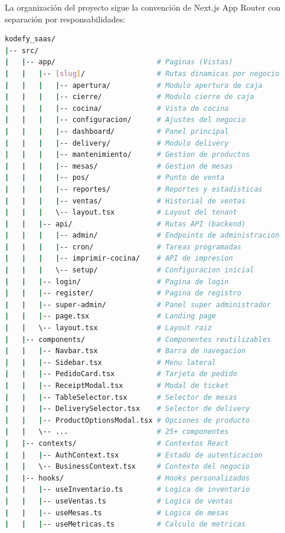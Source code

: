 \documentclass[12pt, a4paper]{article}
\begin{document}
La organización del proyecto sigue la convención de Next.js App Router con separación por responsabilidades:

\begin{lstlisting}[language=bash, caption={Árbol de directorios del proyecto}]
kodefy_saas/
|-- src/
|   |-- app/                        # Paginas (Vistas)
|   |   |-- [slug]/                 # Rutas dinamicas por negocio
|   |   |   |-- apertura/           # Modulo apertura de caja
|   |   |   |-- cierre/             # Modulo cierre de caja
|   |   |   |-- cocina/             # Vista de cocina
|   |   |   |-- configuracion/      # Ajustes del negocio
|   |   |   |-- dashboard/          # Panel principal
|   |   |   |-- delivery/           # Modulo delivery
|   |   |   |-- mantenimiento/      # Gestion de productos
|   |   |   |-- mesas/              # Gestion de mesas
|   |   |   |-- pos/                # Punto de venta
|   |   |   |-- reportes/           # Reportes y estadisticas
|   |   |   |-- ventas/             # Historial de ventas
|   |   |   \-- layout.tsx          # Layout del tenant
|   |   |-- api/                    # Rutas API (backend)
|   |   |   |-- admin/              # Endpoints de administracion
|   |   |   |-- cron/               # Tareas programadas
|   |   |   |-- imprimir-cocina/    # API de impresion
|   |   |   \-- setup/              # Configuracion inicial
|   |   |-- login/                  # Pagina de login
|   |   |-- register/               # Pagina de registro
|   |   |-- super-admin/            # Panel super administrador
|   |   |-- page.tsx                # Landing page
|   |   \-- layout.tsx              # Layout raiz
|   |-- components/                 # Componentes reutilizables
|   |   |-- Navbar.tsx              # Barra de navegacion
|   |   |-- Sidebar.tsx             # Menu lateral
|   |   |-- PedidoCard.tsx          # Tarjeta de pedido
|   |   |-- ReceiptModal.tsx        # Modal de ticket
|   |   |-- TableSelector.tsx       # Selector de mesas
|   |   |-- DeliverySelector.tsx    # Selector de delivery
|   |   |-- ProductOptionsModal.tsx # Opciones de producto
|   |   \-- ...                     # 25+ componentes
|   |-- contexts/                   # Contextos React
|   |   |-- AuthContext.tsx         # Estado de autenticacion
|   |   \-- BusinessContext.tsx     # Contexto del negocio
|   |-- hooks/                      # Hooks personalizados
|   |   |-- useInventario.ts        # Logica de inventario
|   |   |-- useVentas.ts            # Logica de ventas
|   |   |-- useMesas.ts             # Logica de mesas
|   |   |-- useMetricas.ts          # Calculo de metricas

\end{lstlisting}
\end{document}
